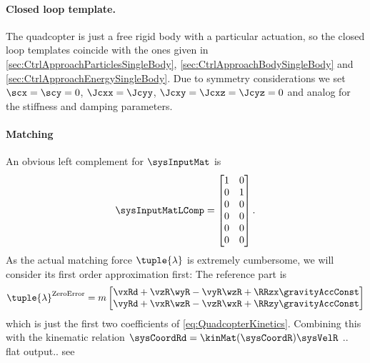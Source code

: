 \paragraph{Closed loop template.}
The quadcopter is just a free rigid body with a particular actuation, so the closed loop templates coincide with the ones given in \autoref{sec:CtrlApproachParticlesSingleBody}, \autoref{sec:CtrlApproachBodySingleBody} and \autoref{sec:CtrlApproachEnergySingleBody}.
Due to symmetry considerations we set $\scx = \scy = 0$, $\Jcxx=\Jcyy$, $\Jcxy=\Jcxz=\Jcyz=0$ and analog for the stiffness and damping parameters.

\paragraph{Matching}
An obvious left complement for $\sysInputMat$ is
\begin{align}
 \sysInputMatLComp = \begin{bmatrix} 1 & 0 \\ 0 & 1 \\ 0 & 0 \\ 0 & 0 \\ 0 & 0 \\ 0 & 0 \end{bmatrix}.
\end{align}
As the actual matching force $\tuple{\lambda}$ is extremely cumbersome, we will consider its first order approximation first:
The reference part is
\begin{align}
 \tuple{\lambda}^{\text{ZeroError}} = m \begin{bmatrix} \vxRd + \vzR\wyR-\vyR\wzR + \RRzx\gravityAccConst \\ \vyRd + \vxR\wzR-\vzR\wxR + \RRzy \gravityAccConst \end{bmatrix}
\end{align}
which is just the first two coefficients of \eqref{eq:QuadcopterKinetics}.
Combining this with the kinematic relation $\sysCoordRd = \kinMat(\sysCoordR)\sysVelR$ .. flat output.. see \cite{Konz:QuadrotorMovingFrame}

